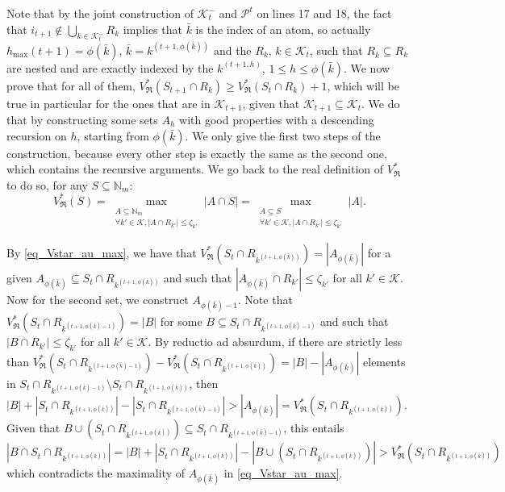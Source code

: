 \documentclass[
  11pt,
  a4paper,
]{article}
\theoremstyle{plain}
\theoremstyle{plain}
\theoremstyle{plain}
\theoremstyle{definition}
\theoremstyle{definition}
\theoremstyle{remark}
\begin{document}
Note that by the joint construction of \(\mathcal{K}^-_t\) and
\(\mathcal{P}^t\) on lines 17 and 18, the fact that
\(i_{t+1}\not\in\bigcup_{k\in\mathcal{K}^-_{t}}R_k\) implies that
\(\bar k\) is the index of an atom, so actually
\(h_{\max}(t+1)=\phi(\bar k)\), \(\bar k = k^{(t+1,\phi(\bar k))}\) and
the \(R_k\), \(k\in\mathcal{K}_{t}\), such that
\(R_{\bar k}\subseteq R_k\) are nested and are exactly indexed by the
\(k^{(t+1,h)}\), \(1\leq h\leq \phi(\bar k)\). We now prove that for all
of them,
\(V^*_{\mathfrak{R}}(S_{t+1}\cap R_k)\geq V^*_{\mathfrak{R}}(S_{t}\cap R_k)+1\),
which will be true in particular for the ones that are in
\(\mathcal{K}_{t+1}\), given that
\(\mathcal{K}_{t+1}\subseteq \mathcal{K}_t\). We do that by constructing
some sets \(A_h\) with good properties with a descending recursion on
\(h\), starting from \(\phi(\bar k)\). We only give the first two steps
of the construction, because every other step is exactly the same as the
second one, which contains the recursive arguments. We go back to the
real definition of \(V^*_{\mathfrak{R}}\) to do so, for any
\(S\subseteq \mathbb{N}_m\): \begin{equation}
\label{eq_Vstar_au_max} V^*_{\mathfrak{R}}(S)=\max_{\substack{A\subseteq \mathbb{N}_m\\\forall k'\in\mathcal{K}, |A\cap R_{k'}|\leq \zeta_{k'}}} |A\cap S| =\max_{\substack{A\subseteq S\\\forall k'\in\mathcal{K}, |A\cap R_{k'}|\leq \zeta_{k'}}} |A|  . 
\end{equation}

By \eqref{eq_Vstar_au_max}, we have that
\(V^*_{\mathfrak{R}}(S_t \cap R_{k^{(t+1,\phi(\bar k))}})=|A_{\phi(\bar k)}|\)
for a given
\(A_{\phi(\bar k)}\subseteq S_t \cap R_{k^{(t+1,\phi(\bar k))}}\) and
such that \(|A_{\phi(\bar k)}\cap R_{k'}|\leq \zeta_{k'}\) for all
\(k'\in\mathcal{K}\). Now for the second set, we construct
\(A_{\phi(\bar k)-1}\). Note that
\(V^*_{\mathfrak{R}}(S_t \cap R_{k^{(t+1,\phi(\bar k)-1)}})=|B|\) for
some \(B\subseteq S_t \cap R_{k^{(t+1,\phi(\bar k)-1)}}\) and such that
\(|B\cap R_{k'}|\leq \zeta_{k'}\) for all \(k'\in\mathcal{K}\). By
reductio ad absurdum, if there are strictly less than
\(V^*_{\mathfrak{R}}(S_t \cap R_{k^{(t+1,\phi(\bar k)-1)}}) - V^*_{\mathfrak{R}}(S_t \cap R_{k^{(t+1,\phi(\bar k))}})=|B|-|A_{\phi(\bar k)}|\)
elements in
\(S_t\cap R_{k^{(t+1,\phi(\bar k)-1)}} \setminus S_t\cap R_{k^{(t+1,\phi(\bar k))}}\),
then
\(|B|+|S_t \cap R_{k^{(t+1,\phi(\bar k))}}|-|S_t \cap R_{k^{(t+1,\phi(\bar k)-1)}}|>|A_{\phi(\bar k)}|=V^*_{\mathfrak{R}}(S_t \cap R_{k^{(t+1,\phi(\bar k))}})\).
Given that
\(B\cup (S_t\cap R_{k^{(t+1,\phi(\bar k))}})\subseteq S_t \cap R_{k^{(t+1,\phi(\bar k)-1)}}\),
this entails
\(|B\cap S_t\cap R_{k^{(t+1,\phi(\bar k))}}| =|B|+|S_t \cap R_{k^{(t+1,\phi(\bar k))}}| -| B\cup (S_t\cap R_{k^{(t+1,\phi(\bar k))}})| > V^*_{\mathfrak{R}}(S_t \cap R_{k^{(t+1,\phi(\bar k))}})\)
which contradicts the maximality of \(A_{\phi(\bar k)}\) in
\eqref{eq_Vstar_au_max}.
\end{document}
